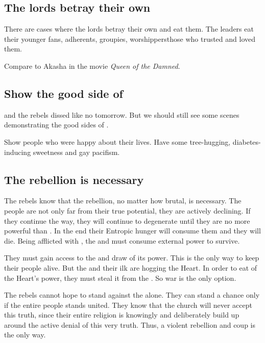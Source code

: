 \subsection{The \resphan{} lords betray their own}
There are cases where the \resphan{} lords betray their own and eat them. 
The leaders eat their younger fans, adherents, groupies, worshippers\dash those who trusted and loved them. 

Compare to Akasha in the movie \emph{Queen of the Damned}. 









\subsection{Show the good side of \Merkyrah}
\Semiza{} and the rebels dissed \Merkyrah{} like no tomorrow. 
But we should still see some scenes demonstrating the good sides of \Merkyrah. 

Show people who were happy about their lives. 
Have some tree-hugging, diabetes-inducing sweetness and gay pacifism. 









\subsection{The rebellion is necessary}
The rebels know that the rebellion, no matter how brutal, is necessary. 
The \resphan{} people are not only far from their true potential, they are actively declining. 
If they continue the \Merkyran{} way, they will continue to degenerate until they are no more powerful than \humans. 
In the end their Entropic hunger will consume them and they will die. 
Being afflicted with \Bane{} , the  and must consume external power to survive. 

They must gain access to the  and draw of its power. 
This is the only way to keep their people alive. 
But the \dragons{} and their ilk are hogging the Heart. 
In order to eat of the Heart's power, they must steal it from the \dragons. 
So war is the only option. 

The rebels cannot hope to stand against the \dragons{} alone. 
They can stand a chance only if the entire \resphan{} people stands united. 
They know that the \Merkyran{} church will never accept this truth, since their entire religion is knowingly and deliberately build up around the active denial of this very truth. 
Thus, a violent rebellion and coup is the only way. 

